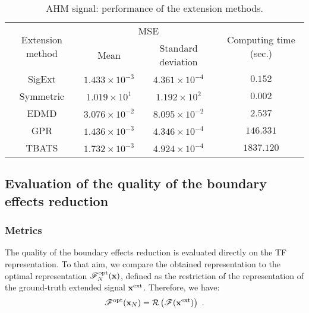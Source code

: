 \begin{table}
\centering
\caption{AHM signal: performance of the extension methods.}
\begin{tabular}{|c||c|c|c|}
  \hline
   \multirow{2}{40pt}{\centering Extension method} & \multicolumn{2}{c|}{MSE}  & \multirow{2}{41pt}{Computing time (sec.)} \\
   \cline{2-3} & Mean & Standard deviation & \\
   \hhline{|=#=|=|=|}
   {\sf SigExt} & $1.433\times 10^{-3}$ & $4.361\times 10^{-4}$ & $0.152$ \\
   \hline
   Symmetric & $1.019\times 10^{1}$ & $1.192\times 10^{2}$ & $0.002$ \\
   \hline
   EDMD & $3.076\times 10^{-2}$ & $8.095\times 10^{-2}$ & $2.537$\\
   \hline
   GPR & $1.436\times 10^{-3}$ & $4.346\times 10^{-4}$ & $146.331$ \\
   \hline
   TBATS & $1.732\times 10^{-3}$ & $4.924\times 10^{-4}$ & $1837.120$ \\
   \hline
\end{tabular}
\label{tab:mse.sine}
\end{table} 


\subsection{Evaluation of the quality of the boundary effects reduction}

\subsubsection{Metrics}
The quality of the boundary effects reduction is evaluated directly on the TF representation. To that aim, we compare the obtained representation to the optimal representation ${\mathscr F}_N^\mathrm{opt}({\mathbf x})$, defined as the restriction of the representation of the ground-truth extended signal ${\mathbf x}^\mathrm{ext}$. Therefore, we have:
\begin{equation}
\ccF^\mathrm{opt}(\bx_N) = \cR\left( \ccF(\bx^\mathrm{ext}) \right) \ .
\label{eq:opt.TFR}
\end{equation} 

